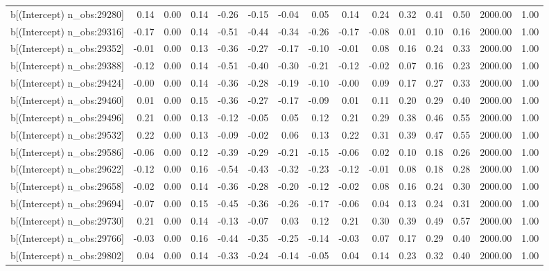 \begin{table}[ht]
\begin{tabular}{rrrrrrrrrrrrrrr}
  b[(Intercept) n\_obs:29280] & 0.14 & 0.00 & 0.14 & -0.26 & -0.15 & -0.04 & 0.05 & 0.14 & 0.24 & 0.32 & 0.41 & 0.50 & 2000.00 & 1.00 \\ 
  b[(Intercept) n\_obs:29316] & -0.17 & 0.00 & 0.14 & -0.51 & -0.44 & -0.34 & -0.26 & -0.17 & -0.08 & 0.01 & 0.10 & 0.16 & 2000.00 & 1.00 \\ 
  b[(Intercept) n\_obs:29352] & -0.01 & 0.00 & 0.13 & -0.36 & -0.27 & -0.17 & -0.10 & -0.01 & 0.08 & 0.16 & 0.24 & 0.33 & 2000.00 & 1.00 \\ 
  b[(Intercept) n\_obs:29388] & -0.12 & 0.00 & 0.14 & -0.51 & -0.40 & -0.30 & -0.21 & -0.12 & -0.02 & 0.07 & 0.16 & 0.23 & 2000.00 & 1.00 \\ 
  b[(Intercept) n\_obs:29424] & -0.00 & 0.00 & 0.14 & -0.36 & -0.28 & -0.19 & -0.10 & -0.00 & 0.09 & 0.17 & 0.27 & 0.33 & 2000.00 & 1.00 \\ 
  b[(Intercept) n\_obs:29460] & 0.01 & 0.00 & 0.15 & -0.36 & -0.27 & -0.17 & -0.09 & 0.01 & 0.11 & 0.20 & 0.29 & 0.40 & 2000.00 & 1.00 \\ 
  b[(Intercept) n\_obs:29496] & 0.21 & 0.00 & 0.13 & -0.12 & -0.05 & 0.05 & 0.12 & 0.21 & 0.29 & 0.38 & 0.46 & 0.55 & 2000.00 & 1.00 \\ 
  b[(Intercept) n\_obs:29532] & 0.22 & 0.00 & 0.13 & -0.09 & -0.02 & 0.06 & 0.13 & 0.22 & 0.31 & 0.39 & 0.47 & 0.55 & 2000.00 & 1.00 \\ 
  b[(Intercept) n\_obs:29586] & -0.06 & 0.00 & 0.12 & -0.39 & -0.29 & -0.21 & -0.15 & -0.06 & 0.02 & 0.10 & 0.18 & 0.26 & 2000.00 & 1.00 \\ 
  b[(Intercept) n\_obs:29622] & -0.12 & 0.00 & 0.16 & -0.54 & -0.43 & -0.32 & -0.23 & -0.12 & -0.01 & 0.08 & 0.18 & 0.28 & 2000.00 & 1.00 \\ 
  b[(Intercept) n\_obs:29658] & -0.02 & 0.00 & 0.14 & -0.36 & -0.28 & -0.20 & -0.12 & -0.02 & 0.08 & 0.16 & 0.24 & 0.30 & 2000.00 & 1.00 \\ 
  b[(Intercept) n\_obs:29694] & -0.07 & 0.00 & 0.15 & -0.45 & -0.36 & -0.26 & -0.17 & -0.06 & 0.04 & 0.13 & 0.24 & 0.31 & 2000.00 & 1.00 \\ 
  b[(Intercept) n\_obs:29730] & 0.21 & 0.00 & 0.14 & -0.13 & -0.07 & 0.03 & 0.12 & 0.21 & 0.30 & 0.39 & 0.49 & 0.57 & 2000.00 & 1.00 \\ 
  b[(Intercept) n\_obs:29766] & -0.03 & 0.00 & 0.16 & -0.44 & -0.35 & -0.25 & -0.14 & -0.03 & 0.07 & 0.17 & 0.29 & 0.40 & 2000.00 & 1.00 \\ 
  b[(Intercept) n\_obs:29802] & 0.04 & 0.00 & 0.14 & -0.33 & -0.24 & -0.14 & -0.05 & 0.04 & 0.14 & 0.23 & 0.32 & 0.40 & 2000.00 & 1.00 \\ 

\end{tabular}
\end{table}
